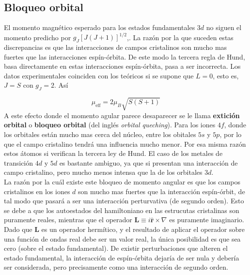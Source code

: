 \documentclass[12pt,a4paper]{book}
\numberwithin{equation}{section}
\numberwithin{figure}{section}
\newcommand{\eff}{\mathrm{eff}}
\newcommand{\rn}{\mathbf{r}}
\newcommand{\Ln}{\mathbf{L}}
\newcommand{\hnr}{\hat{\rn}}
\begin{document}
\subsection{Bloqueo orbital}

El momento magnético esperado para los estados fundamentales $3d$ no siguen el momento predicho por $g_J[J(J+1)]^{1/2}$,. La razón por la que suceden estas discrepancias es que las interacciones de campos  cristalinos son mucho mas fuertes que las interacciones espín-órbita. De este modo la tercera regla de Hund, basa directamente en estas interacciones espín-órbita, pasa a ser incorrecta. Los datos experimentales coinciden con los teóricos si se supone que $L=0$, esto es, $J=S$ con $g_J = 2$. Así

\begin{equation}
    \mu_{\eff} = 2 \mu_B \sqrt{S(S+1)}
\end{equation}
A este efecto donde el momento agular parece desaparecer se le llama \textbf{extición orbital} o \textbf{bloqueo orbital} (del inglés \textit{orbital queching}). Para los iones $4f$, donde los orbitales están mucho mas cerca del núcleo, entre los obitales $5s$ y $5p$, por lo que el campo cristalino tendrá una influencia mucho menor. Por esa misma razón estos átomos si verifican la tercera ley de Hund. El caso de los metales de transición $4d$ y $5d$ es bastante ambiguo, ya que si presentan una interacción de campo cristalino, pero mucho menos intensa que la de los orbitales $3d$. \\

La razón por la cuál existe este bloqueo de momento angular es que los campos cristalinos en los iones $d$ son mucho mas fuertes que la interacción espín-órbit, de tal modo que pasará a ser una interacción perturvativa (de segundo orden). Esto se debe a que los autoestados del hamiltoniano en las estrucutas cristalinas son puramente reales, mientras que el operador $\Ln \equiv i\hnr \times \nabla$ es puramente imaginario. Dado que $\Ln$ es un operador hermítico, y el resultado de aplicar el operador sobre una función de ondas real debe ser un valor real, la única posibilidad es que sea cero (sobre el estado fundamental). De existir perturbaciones que alteren el estado fundamental, la interacción de espín-órbita dejaría de ser nula y debería ser considerada, pero precisamente como una interacción de segundo orden.  


\end{document}
